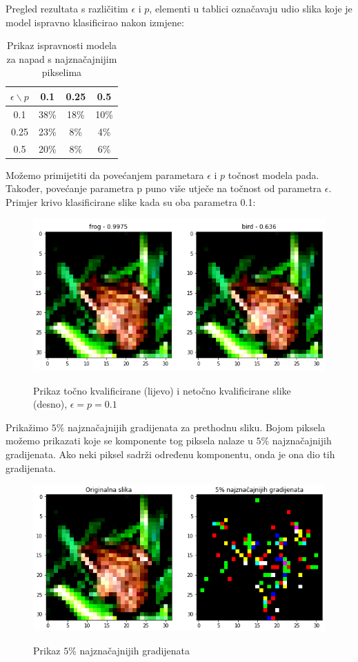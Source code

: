 Pregled rezultata s različitim $\epsilon$ i $p$, elementi u tablici označavaju udio slika koje je model ispravno klasificirao nakon izmjene: 

\begin{table}[h!]
	\centering
	\begin{tabular}{||c || c c c||} 
		\hline
		$\epsilon \backslash p$ & 0.1 & 0.25 & 0.5 \\ [0.5ex] 
		\hline\hline
		0.1 & 38\% & 18\% & 10\% \\ 
		0.25 & 23\% & 8\% & 4\% \\
		0.5 & 20\% & 8\% & 6\% \\ [1ex] 
		\hline
	\end{tabular}
	\caption{Prikaz ispravnosti modela za napad s najznačajnijim pikselima}
\end{table}

Možemo primijetiti da povećanjem parametara $\epsilon$ i $p$ točnost modela pada. Također, povećanje parametra p puno više utječe na točnost od parametra $\epsilon$. Primjer krivo klasificirane slike kada su oba parametra 0.1:
\begin{figure}[H]
	\centering
	{{\includegraphics[width=12cm]{slike/napadi/selected-grads-example.png} }}%
	\caption{Prikaz točno kvalificirane (lijevo) i netočno kvalificirane slike (desno), $\epsilon = p = 0.1$}%
	\label{fig:example}%
\end{figure}

Prikažimo $5\%$ najznačajnijih gradijenata za prethodnu sliku. Bojom piksela možemo prikazati koje se komponente tog piksela nalaze u $5\%$ najznačajnijih gradijenata. Ako neki piksel sadrži određenu komponentu, onda je ona dio tih gradijenata.
\begin{figure}[H]
	\centering
	{{\includegraphics[width=12cm]{slike/napadi/selected-grads-visualisation.png} }}%
	\caption{Prikaz $5\%$ najznačajnijih gradijenata}%
	\label{fig:example}%
\end{figure}

